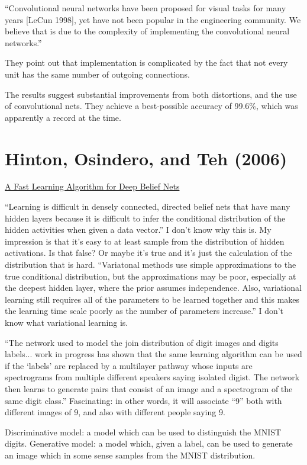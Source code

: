 \documentclass[12pt]{report}
\newcommand{\link}[2]{\href{#1}{#2}}
\begin{document}
``Convolutional neural networks have been proposed for visual tasks
for many years [LeCun 1998], yet have not been popular in the
engineering community.  We believe that is due to the complexity of
implementing the convolutional neural networks.''

They point out that implementation is complicated by the fact that not
every unit has the same number of outgoing connections.

The results suggest substantial improvements from both distortions,
and the use of convolutional nets.  They achieve a best-possible
accuracy of 99.6\%, which was apparently a record at the time.

\section{Hinton, Osindero, and Teh (2006)}

\link{http://www.cs.toronto.edu/\~hinton/absps/ncfast.pdf}{A Fast
  Learning Algorithm for Deep Belief Nets}

``Learning is difficult in densely connected, directed belief nets
that have many hidden layers because it is difficult to infer the
conditional distribution of the hidden activities when given a data
vector.'' I don't know why this is.  My impression is that it's easy
to at least sample from the distribution of hidden activations.  Is
that false?  Or maybe it's true and it's just the calculation of the
distribution that is hard.  ``Variatonal methods use simple
approximations to the true conditional distribution, but the
approximations may be poor, especially at the deepest hidden layer,
where the prior assumes independence.  Also, variational learning
still requires all of the parameters to be learned together and this
makes the learning time scale poorly as the number of parameters
increase.''  I don't know what variational learning is.

``The network used to model the join distribution of digit images and
digits labels... work in progress has shown that the same learning
algorithm can be used if the `labels' are replaced by a multilayer
pathway whose inputs are spectrograms from multiple different speakers
saying isolated digist.  The network then learns to generate pairs
that consist of an image and a spectrogram of the same digit class.''
Fascinating: in other words, it will associate ``9'' both with
different images of 9, and also with different people saying 9.

Discriminative model: a model which can be used to distinguish the
MNIST digits.  Generative model: a model which, given a label, can be
used to generate an image which in some sense samples from the MNIST
distribution.  
\end{document}

